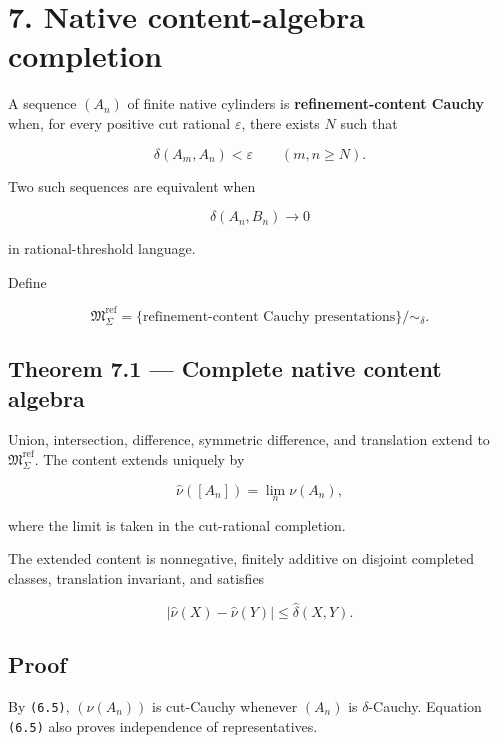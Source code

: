 \hypertarget{native-content-algebra-completion}{%
\section{7. Native content-algebra completion}\label{native-content-algebra-completion}}

A sequence \((A_n)\) of finite native cylinders is \textbf{refinement-content Cauchy}
when, for every positive cut rational \(\varepsilon\), there exists \(N\) such
that

\[
\delta(A_m,A_n)<\varepsilon
\qquad(m,n\ge N).
\tag{7.1}
\]

Two such sequences are equivalent when

\[
\delta(A_n,B_n)\longrightarrow0
\tag{7.2}
\]

in rational-threshold language.

Define

\[
\boxed{
\mathfrak M_\Sigma^{\mathrm{ref}}
=
\{\text{refinement-content Cauchy presentations}\}/\sim_\delta.
}
\tag{7.3}
\]

\hypertarget{theorem-7.1-complete-native-content-algebra}{%
\subsection{Theorem 7.1 --- Complete native content algebra}\label{theorem-7.1-complete-native-content-algebra}}

Union, intersection, difference, symmetric difference, and translation extend
to \(\mathfrak M_\Sigma^{\mathrm{ref}}\). The content extends uniquely by

\[
\boxed{
\widehat\nu([A_n])
=\lim_n\nu(A_n),
}
\tag{7.4}
\]

where the limit is taken in the cut-rational completion.

The extended content is nonnegative, finitely additive on disjoint completed
classes, translation invariant, and satisfies

\[
|\widehat\nu(X)-\widehat\nu(Y)|
\le
\widehat\delta(X,Y).
\tag{7.5}
\]

\hypertarget{proof-4}{%
\subsection{Proof}\label{proof-4}}

By \texttt{(6.5)}, \((\nu(A_n))\) is cut-Cauchy whenever \((A_n)\) is
\(\delta\)-Cauchy. Equation \texttt{(6.5)} also proves independence of representatives.

